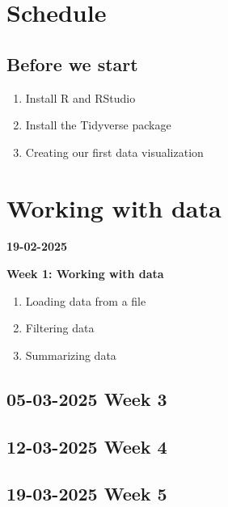 \documentclass{article}
\newcommand{\week}[2]{
    \begin{minipage}[t]{0.5\textwidth}
        \textbf{#1}
    \end{minipage}
    \begin{minipage}[t]{0.5\textwidth}
        \textbf{#2}
    \end{minipage}
}
\begin{document}
\section*{Schedule}

\subsection*{Before we start}
\begin{enumerate}
    \item Install R and RStudio
    \item Install the Tidyverse package
    \item Creating our first data visualization
\end{enumerate}

\section{Working with data}


\week{19-02-2025}{Week 1: Working with data}

\begin{enumerate}
    \item Loading data from a file
    \item Filtering data
    \item Summarizing data
\end{enumerate}





\subsection*{05-03-2025 \textbf{Week 3}}

\subsection*{12-03-2025 \textbf{Week 4}}
\subsection*{19-03-2025 \textbf{Week 5}}
\end{document}
